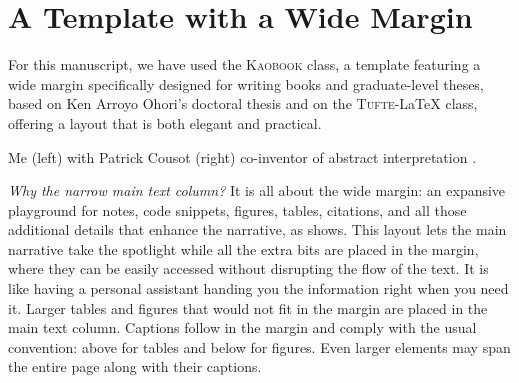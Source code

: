 \def\customcitkey{}\def\absintkey{}


\chapter*{A Template with a Wide Margin}

For this manuscript, we have used the \textsc{Kaobook} class, a template featuring a wide margin specifically designed for writing books and graduate-level theses, based on Ken Arroyo Ohori's doctoral thesis and on the \textsc{Tufte}-\LaTeX{} class, offering a layout that is both elegant and practical.

\newcommand*{\ClipSep}{0.5cm}
\begin{marginfigure}
  \centering
  \hspace*{-\ClipSep}
    \vspace*{-\ClipSep}
  \caption{Me (left) with Patrick Cousot (right) co-inventor of abstract interpretation \cite{\absintkey}.}
\end{marginfigure}

\emph{Why the narrow main text column?} It is all about the wide margin: an expansive playground for notes, code snippets, figures, tables, citations, and all those additional details that enhance the narrative, as  shows.
This layout lets the main narrative take the spotlight while all the extra bits are placed in the margin, where they can be easily accessed without disrupting the flow of the text. It is like having a personal assistant handing you the information right when you need it.
%
Larger tables and figures that would not fit in the margin are placed in the main text column. Captions follow in the margin and comply with the usual convention: above for tables and below for figures. Even larger elements may span the entire page along with their captions.


